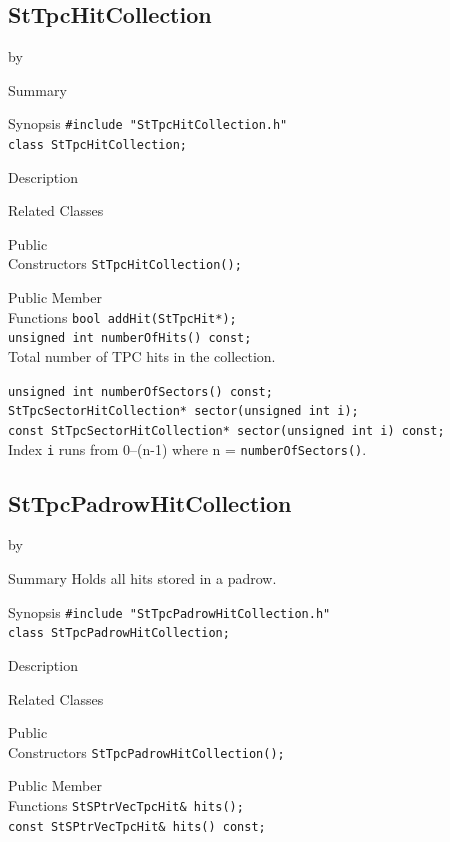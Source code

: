 \documentclass[twoside]{article}
\newcommand{\entrylabel}[1]{\mbox{\textbf{{#1}}}\hfil}%
\newenvironment{entry}
{\begin{list}{}%
    {\renewcommand{\makelabel}{\entrylabel}%
     \setlength{\labelwidth}{90pt}%
     \setlength{\leftmargin}{\labelwidth}
     \advance\leftmargin by \labelsep%
      }%
    }%
  {\end{list}}
\newcommand{\Entrylabel}[1]%
{\raisebox{0pt}[1ex][0pt]{\makebox[\labelwidth][l]%
    {\parbox[t]{\labelwidth}{\hspace{0pt}\textbf{{#1}}}}}}
\newenvironment{Entry}%
{\renewcommand{\entrylabel}{\Entrylabel}\begin{entry}}%
  {\end{entry}}
\begin{document}
\subsection{StTpcHitCollection}
\label{sec:StTpcHitCollection}
\begin{Entry}
\item[Summary]
\item[Synopsis]
    \verb+#include "StTpcHitCollection.h"+\\
    \verb+class StTpcHitCollection;+\\
\item[Description]
\item[Related Classes]
\item[Public\\ Constructors]
    \verb+StTpcHitCollection();+\\
\item[Public Member\\ Functions]
    \verb+bool addHit(StTpcHit*);+\\
    
    \verb+unsigned int numberOfHits() const;+\\
    Total number of TPC hits in the collection.
    
    \verb+unsigned int numberOfSectors() const;+\\

    \verb+StTpcSectorHitCollection* sector(unsigned int i);+\\
    \verb+const StTpcSectorHitCollection* sector(unsigned int i) const;+\\
    Index \texttt{i} runs from 0--(n-1) where n =
    \texttt{numberOfSectors()}.
\end{Entry}
\clearpage


\subsection{StTpcPadrowHitCollection}
\label{sec:StTpcPadrowHitCollection}
\begin{Entry}
\item[Summary] Holds all hits stored in a padrow.
\item[Synopsis]
    \verb+#include "StTpcPadrowHitCollection.h"+\\
    \verb+class StTpcPadrowHitCollection;+\\
\item[Description]
\item[Related Classes]
\item[Public\\ Constructors]
    \verb+StTpcPadrowHitCollection();+\\
\item[Public Member\\ Functions]
    \verb+StSPtrVecTpcHit& hits();+\\
    \verb+const StSPtrVecTpcHit& hits() const;+\\
\end{Entry}
\clearpage
\end{document}
